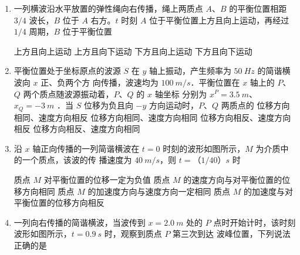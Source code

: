 

\begin{enumerate}
	\item
{}
一列横波沿水平放置的弹性绳向右传播，绳上两质点 $ A $、$ B $ 的平衡位置相距 $ 3/4 $ 波长，$ B $ 位于 $ A $
右方。$ t $ 时刻 $ A $ 位于平衡位置上方且向上运动，再经过 $ 1/4 $ 周期，$ B $ 位于平衡位置  

\fourchoices
{上方且向上运动}
{上方且向下运动}
{下方且向上运动}
{下方且向下运动}



\item 
{}
平衡位置处于坐标原点的波源 $ S $ 在 $ y $ 轴上振动，产生频率为 $ 50 \ Hz $ 的简谐横波向 $ x $ 正、负两个方
向传播，波速均为 $ 100 \ m /s $．平衡位置在 $ x $ 轴上的 $ P $、$ Q $ 两个质点随波源振动着，$ P $、$ Q $ 的 $ x $ 轴坐标
分别为 $ x^{P}=3.5 \ m $、$ x_Q=-3 \ m $ ．当 $ S $ 位移为负且向 $ -y $ 方向运动时，$ P $、$ Q $ 两质点的  
\fourchoices
{位移方向相同、速度方向相反}
{位移方向相同、速度方向相同}
{位移方向相反、速度方向相反}
{位移方向相反、速度方向相同}



\item 
{}
沿 $ x $ 轴正向传播的一列简谐横波在 $ t=0 $ 时刻的波形如图所示，$ M $ 为介质中的一个质点，该波的传
播速度为 $ 40 \ m /s $，则 $ t= $（$ 1/40 $）$ s $ 时  
\begin{figure}[h!]
	\centering
	
\end{figure}

\fourchoices
{质点 $ M $ 对平衡位置的位移一定为负值}
{质点 $ M $ 的速度方向与对平衡位置的位移方向相同}
{质点 $ M $ 的加速度方向与速度方向一定相同}
{质点 $ M $ 的加速度与对平衡位置的位移方向相反}

\item 
{}
一列向右传播的简谐横波，当波传到 $ x=2.0 \ m $ 处的 $ P $ 点时开始计时，该时刻
波形如图所示，$ t=0.9 \ s $ 时，观察到质点 $ P $ 第三次到达
波峰位置，下列说法正确的是  
\begin{figure}[h!]
	\centering
	
\end{figure}




\end{enumerate}
